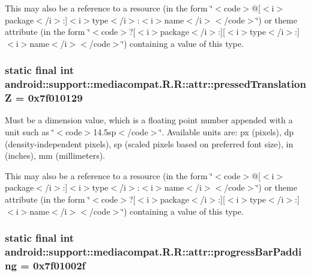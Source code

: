 This may also be a reference to a resource (in the form \char`\"{}$<$code$>$@\mbox{[}$<$i$>$package$<$/i$>$:\mbox{]}$<$i$>$type$<$/i$>$:$<$i$>$name$<$/i$>$$<$/code$>$\char`\"{}) or theme attribute (in the form \char`\"{}$<$code$>$?\mbox{[}$<$i$>$package$<$/i$>$:\mbox{]}\mbox{[}$<$i$>$type$<$/i$>$:\mbox{]}$<$i$>$name$<$/i$>$$<$/code$>$\char`\"{}) containing a value of this type. \hypertarget{classandroid_1_1support_1_1mediacompat_1_1_r_1_1attr_2a9b88e8b1814f6e5c11998472e47388}{
\subsubsection[{pressedTranslationZ}]{\setlength{\rightskip}{0pt plus 5cm}static final int android::support::mediacompat.R.R::attr::pressedTranslationZ = 0x7f010129}}
\label{classandroid_1_1support_1_1mediacompat_1_1_r_1_1attr_2a9b88e8b1814f6e5c11998472e47388}


Must be a dimension value, which is a floating point number appended with a unit such as \char`\"{}$<$code$>$14.5sp$<$/code$>$\char`\"{}. Available units are: px (pixels), dp (density-independent pixels), sp (scaled pixels based on preferred font size), in (inches), mm (millimeters). 

This may also be a reference to a resource (in the form \char`\"{}$<$code$>$@\mbox{[}$<$i$>$package$<$/i$>$:\mbox{]}$<$i$>$type$<$/i$>$:$<$i$>$name$<$/i$>$$<$/code$>$\char`\"{}) or theme attribute (in the form \char`\"{}$<$code$>$?\mbox{[}$<$i$>$package$<$/i$>$:\mbox{]}\mbox{[}$<$i$>$type$<$/i$>$:\mbox{]}$<$i$>$name$<$/i$>$$<$/code$>$\char`\"{}) containing a value of this type. \hypertarget{classandroid_1_1support_1_1mediacompat_1_1_r_1_1attr_a289072bcd83b0f0da303e8ac1386d5d}{
\subsubsection[{progressBarPadding}]{\setlength{\rightskip}{0pt plus 5cm}static final int android::support::mediacompat.R.R::attr::progressBarPadding = 0x7f01002f}}
\label{classandroid_1_1support_1_1mediacompat_1_1_r_1_1attr_a289072bcd83b0f0da303e8ac1386d5d}


